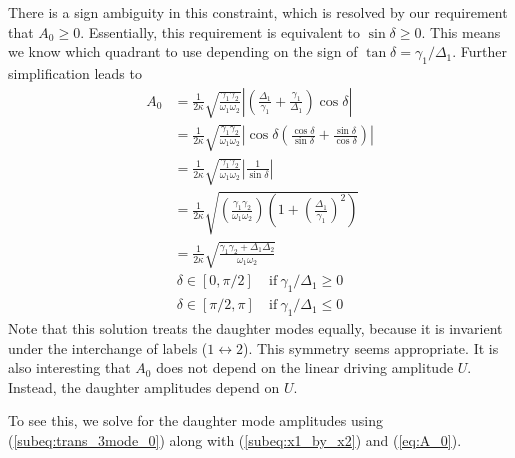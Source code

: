 There is a sign ambiguity in this constraint, which is resolved by our requirement that $A_0 \geq 0$. Essentially, this requirement is equivalent to $\sin{\delta} \geq 0$. This means we know which quadrant to use depending on the sign of $\tan{\delta}=\gamma_1/\Delta_1$. Further simplification leads to
\begin{subequations}\label{eq:A_0}
\begin{align}
A_0  & = \frac{1}{2\kappa} \sqrt{\frac{\gamma_1\gamma_2}{\omega_1\omega_2}} \left| \left(\frac{\Delta_1}{\gamma_1} + \frac{\gamma_1}{\Delta_1}\right) \cos{\delta} \right| \\
     & = \frac{1}{2\kappa} \sqrt{\frac{\gamma_1\gamma_2}{\omega_1\omega_2}} \left| \cos{\delta} \left(\frac{\cos{\delta}}{\sin{\delta}} + \frac{\sin{\delta}}{\cos{\delta}} \right) \right| \\
     & = \frac{1}{2\kappa} \sqrt{\frac{\gamma_1\gamma_2}{\omega_1\omega_2}} \left| \frac{1}{\sin{\delta}} \right| \\
     & = \frac{1}{2\kappa} \sqrt{\left(\frac{\gamma_1\gamma_2}{\omega_1\omega_2}\right) \left(1+\left(\frac{\Delta_1}{\gamma_1}\right)^2 \right)} \\
     & = \frac{1}{2\kappa} \sqrt{\frac{\gamma_1\gamma_2 + \Delta_1\Delta_2}{\omega_1\omega_2}}
\end{align}
\end{subequations}
\begin{subequations}
\begin{align}
\delta \in [0, \pi/2] & \mathrm{\ if\ } \gamma_1/\Delta_1 \geq 0 \\
\delta \in [\pi/2, \pi] & \mathrm{\ if\ } \gamma_1/\Delta_1 \leq 0 
\end{align}
\end{subequations}
Note that this solution treats the daughter modes equally, because it is invarient under the interchange of labels ($1 \leftrightarrow 2$). This symmetry seems appropriate. It is also interesting that $A_0$ does not depend on the linear driving amplitude $U$. Instead, the daughter amplitudes depend on $U$.

To see this, we solve for the daughter mode amplitudes using (\ref{subeq:trans_3mode_0}) along with (\ref{subeq:x1_by_x2}) and (\ref{eq:A_0}).

